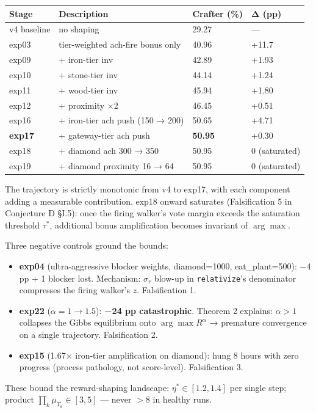 \documentclass[11pt,letterpaper]{article}
\begin{document}
\begin{tabular}{l l l l}
\toprule
Stage & Description & Crafter (\%) & Δ (pp) \\
\midrule
v4 baseline & no shaping & 29.27 & — \\
exp03 & tier-weighted ach-fire bonus only & 40.96 & +11.7 \\
exp09 & + iron-tier inv & 42.89 & +1.93 \\
exp10 & + stone-tier inv & 44.14 & +1.24 \\
exp11 & + wood-tier inv & 45.94 & +1.80 \\
exp12 & + proximity ×2 & 46.45 & +0.51 \\
exp16 & + iron-tier ach push (150 → 200) & 50.65 & +4.71 \\
\textbf{exp17} & + gateway-tier ach push & \textbf{50.95} & +0.30 \\
exp18 & + diamond ach 300 → 350 & 50.95 & 0 (saturated) \\
exp19 & + diamond proximity 16 → 64 & 50.95 & 0 (saturated) \\
\bottomrule
\end{tabular}

The trajectory is strictly monotonic from v4 to exp17, with each
component adding a measurable contribution. exp18 onward saturates
(Falsification 5 in Conjecture D §I.5): once the firing walker's vote
margin exceeds the saturation threshold $\tau^*$, additional bonus
amplification becomes invariant of $\arg\max$.

Three negative controls ground the bounds:

\begin{itemize}
\item \textbf{exp04} (ultra-aggressive blocker weights, diamond=1000, eat\_plant=500): −4 pp + 1 blocker lost. Mechanism: $\sigma_r$ blow-up in \texttt{relativize}'s denominator compresses the firing walker's $z$. Falsification 1.
\item \textbf{exp22} ($\alpha = 1 \to 1.5$): \textbf{−24 pp catastrophic}. Theorem 2 explains: $\alpha > 1$ collapses the Gibbs equilibrium onto $\arg\max R^\alpha$ → premature convergence on a single trajectory. Falsification 2.
\item \textbf{exp15} (1.67× iron-tier amplification on diamond): hung 8 hours with zero progress (process pathology, not score-level). Falsification 3.
\end{itemize}
These bound the reward-shaping landscape: $\eta^* \in [1.2, 1.4]$ per
single step; product $\prod_k \mu_{T_k} \in [3, 5]$ — never $> 8$ in
healthy runs.
\end{document}
